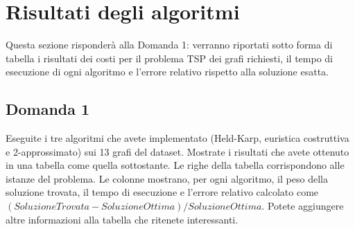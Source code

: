 \section{Risultati degli algoritmi}
Questa sezione risponderà alla Domanda 1: verranno riportati sotto forma di tabella i risultati dei costi per il problema TSP dei grafi richiesti, il tempo di esecuzione di ogni algoritmo e l'errore relativo rispetto alla soluzione esatta.

\subsection{Domanda 1}
Eseguite i tre algoritmi che avete implementato (Held-Karp, euristica costruttiva e 2-approssimato) sui 13 grafi del dataset. Mostrate i risultati che avete ottenuto in una tabella come quella sottostante. Le righe della tabella corrispondono alle istanze del problema. Le colonne mostrano, per ogni algoritmo, il peso della soluzione trovata, il tempo di esecuzione e l'errore relativo calcolato come $(SoluzioneTrovata - SoluzioneOttima)/SoluzioneOttima$. Potete aggiungere altre informazioni alla tabella che ritenete interessanti. 
